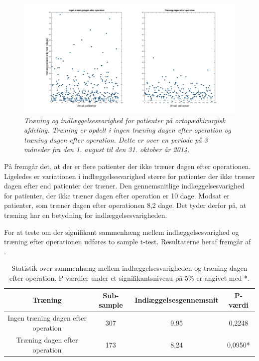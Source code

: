 \begin{figure}[H]
	\centering
	\includegraphics[scale=0.35]{figures/traeningindlaeg.png}
	\caption{\textit{Træning og indlæggelsesvarighed for patienter på ortopædkirurgisk afdeling. Træning er opdelt i ingen træning dagen efter operation og træning dagen efter operation. Dette er over en periode på 3 måneder fra den 1. august til den 31. oktober år 2014.}}
	\label{traeningindlaeg}
	\end{figure}

\noindent
På  fremgår det, at der er flere patienter  der ikke træner dagen efter operationen. Ligeledes er variationen i indlæggelsesvarighed større for patienter der ikke træner dagen efter end patienter der træner. Den gennemsnitlige indlæggelsesvarighed for patienter, der ikke træner dagen efter operation er 10 dage. Modsat er patienter, som træner dagen efter operationen 8,2 dage. Det tyder derfor på, at træning har en betydning for indlæggelsesvarigheden. 

For at teste om der signifikant sammenhæng mellem indlæggelsesvarighed og træning efter operationen udføres to sample t-test. Resultaterne heraf fremgår af . 

\begin{table}[H]
\centering
\begin{tabular}{|c|c|c|c|}
\hline
\textbf{Træning}    & \textbf{Sub-sample} & \textbf{Indlæggelsesgennemsnit} & \textbf{P-værdi} \\ \hline
Ingen træning dagen efter operation      & 307                 & 9,95                            & 0,2248           \\ \hline
Træning dagen efter operation & 173                 & 8,24                            & 0,0950*          \\ \hline
\end{tabular}
\caption{Statistik over sammenhæng mellem indlæggelsesvarigheden og træning dagen efter operation. P-værdier under et signifikantsniveau på 5\% er angivet med *.}
\label{traeningindlaegtab}
\end{table}

